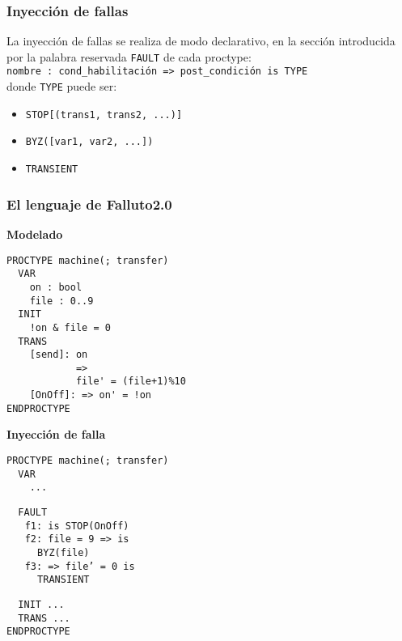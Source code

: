\documentclass[serif]{beamer}
\begin{document}
\begin{frame}
\frametitle{Inyección de fallas}
La inyección de fallas se realiza de modo declarativo, en la 
sección introducida por la palabra reservada \texttt{FAULT} de 
cada proctype:\\[0.5cm]
\texttt{nombre : cond\_habilitaci\'on => post\_condición is TYPE} \\[0.5cm]
donde \texttt{TYPE} puede ser: \\[0.5cm]
\begin{itemize}
\item \texttt{STOP[(trans1, trans2, ...)]}
\item \texttt{BYZ([var1, var2, ...])}
\item \texttt{TRANSIENT}
\end{itemize}
\end{frame}


\begin{frame}[fragile]
\frametitle{El lenguaje de Falluto2.0}
{\fontsize{7pt}{10pt}\selectfont
\begin{minipage}{0.45\textwidth}
{\large \bfseries Modelado}
\begin{framed} 
\begin{verbatim}
PROCTYPE machine(; transfer)
  VAR
    on : bool
    file : 0..9
  INIT
    !on & file = 0
  TRANS
    [send]: on 
            => 
            file' = (file+1)%10
    [OnOff]: => on' = !on
ENDPROCTYPE
\end{verbatim}
\end{framed}
\end{minipage}
\hspace{0.04\textwidth}
\begin{minipage}{0.45\textwidth}
{\large \bfseries Inyección de falla}
\begin{framed}
\begin{verbatim}
PROCTYPE machine(; transfer)
  VAR
    ...
\end{verbatim}
\texttt{\color{red}~~FAULT\\$~~~~~$
f1: is STOP(OnOff)\\$~~~~~$
f2: file = 9 => is\\$~~~~~~~~~~$ BYZ(file)\\$~~~~~$
f3: => file' = 0 is\\$~~~~~~~~~~$ TRANSIENT}
\begin{verbatim}
  INIT ...
  TRANS ...
ENDPROCTYPE
\end{verbatim}
\end{framed}
\end{minipage}
} %

\end{frame}
\end{document}
